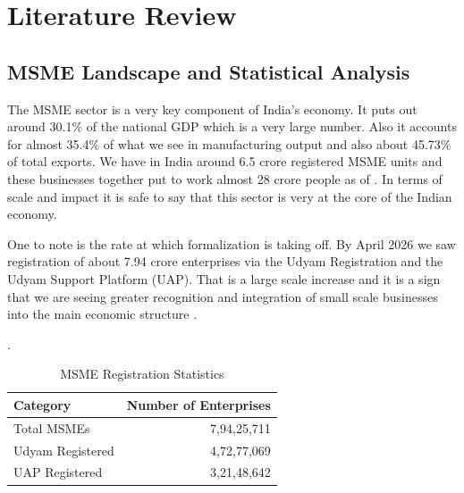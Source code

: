 \chapter{Literature Review}

\section{MSME Landscape and Statistical Analysis}

The MSME sector is a very key component of India's economy. It puts out around 30.1\% of the national GDP which is a very large number. Also it accounts for almost 35.4\% of what we see in manufacturing output and also about 45.73\% of total exports. We have in India around 6.5 crore registered MSME units and these businesses together put to work almost 28 crore people as of \cite{pib_msme2025}. In terms of scale and impact it is safe to say that this sector is very at the core of the Indian economy.

One to note is the rate at which formalization is taking off. By April 2026 we saw registration of about 7.94 crore enterprises via the Udyam Registration and the Udyam Support Platform (UAP). That is a large scale increase and it is a sign that we are seeing greater recognition and integration of small scale businesses into the main economic structure \cite{msme_annual_report}. \begin{table}[htbp].

\centering

\small

\begin{tabular}{|l|r|}

\hline

\textbf{Category} & \textbf{Number of Enterprises} \\

\hline

Total MSMEs & 7,94,25,711 \\

Udyam Registered & 4,72,77,069 \\

UAP Registered & 3,21,48,642 \\

\hline

\end{tabular}

\caption{MSME Registration Statistics \cite{msme_annual_report}}

\end{table}

